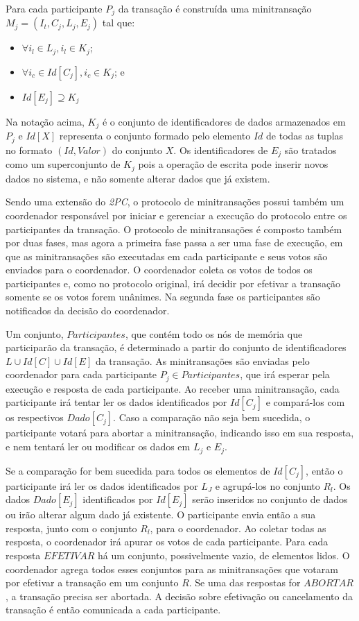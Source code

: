 \documentclass[11pt,twoside,a4paper]{book}
\begin{document}
Para cada participante \(P_j\) da transação é construída uma minitransação \(M_j = (I_t, C_j, L_j, E_j)\) tal que:

\begin{itemize}
    \item $\forall i_l \in L_j, i_l \in K_j$;
    \item $\forall i_c \in Id[C_j], i_c \in K_j$; e
    \item $Id[E_j] \supseteq K_j$
\end{itemize}

Na notação acima, $K_j$ é o conjunto de identificadores de dados armazenados em $P_j$ e $Id[X]$ representa o conjunto formado pelo elemento $Id$ de todas as tuplas no formato $(Id, Valor)$ do conjunto $X$. Os identificadores de $E_j$ são tratados como um superconjunto de $K_j$ pois a operação de escrita pode inserir novos dados no sistema, e não somente alterar dados que já existem.

Sendo uma extensão do \emph{2PC}, o protocolo de minitransações possui também um coordenador responsável por iniciar e gerenciar a execução do protocolo entre os participantes da transação. O protocolo de minitransações é composto também por duas fases, mas agora a primeira fase passa a ser uma fase de execução, em que as minitransações são executadas em cada participante e seus votos são enviados para o coordenador. O coordenador coleta os votos de todos os participantes e, como no protocolo original, irá decidir por efetivar a transação somente se os votos forem unânimes. Na segunda fase os participantes são notificados da decisão do coordenador. 

Um conjunto, $Participantes$, que contém todo os nós de memória que participarão da transação, é determinado a partir do conjunto de identificadores $L \cup Id[C] \cup Id[E]$ da transação. As minitransações são enviadas pelo coordenador para cada participante $P_j \in Participantes$, que irá esperar pela execução e resposta de cada participante. Ao receber uma minitransação, cada participante irá tentar ler os dados identificados por $Id[C_j]$ e compará-los com os respectivos $Dado[C_j]$. Caso a comparação não seja bem sucedida, o participante votará para abortar a minitransação, indicando isso em sua resposta, e nem tentará ler ou modificar os dados em $L_j$ e $E_j$.

Se a comparação for bem sucedida para todos os elementos de $Id[C_j]$, então o participante irá ler os dados identificados por $L_J$ e agrupá-los no conjunto $R_l$. Os dados $Dado[E_j]$ identificados por $Id[E_j]$ serão inseridos no conjunto de dados ou irão alterar algum dado já existente. O participante envia então a sua resposta, junto com o conjunto $R_l$, para o coordenador. Ao coletar todas as resposta, o coordenador irá apurar os votos de cada participante. Para cada resposta $EFETIVAR$ há um conjunto, possivelmente vazio, de elementos lidos. O coordenador agrega todos esses conjuntos para as minitransações que votaram por efetivar a transação em um conjunto $R$. Se uma das respostas for $ABORTAR$, a transação precisa ser abortada. A decisão sobre efetivação ou cancelamento da transação é então comunicada a cada participante.
\end{document}
